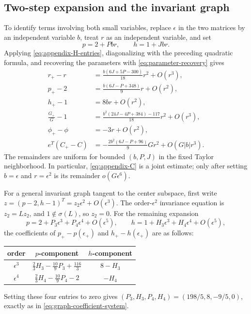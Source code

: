 \documentclass[11pt]{article}
\begin{document}
\subsection{Two-step expansion and the invariant graph}

To identify terms involving both small variables, replace $\epsilon$ in the
two matrices by an independent variable $b$, treat $r$ as an independent
variable, and set
\[
p=2+Pbr,\qquad h=1+Jbr.
\]
Applying \eqref{eq:appendix-H-entries}, diagonalizing with the preceding
quadratic formula, and recovering the parameters with
\eqref{eq:parameter-recovery} gives
\begin{align}
r_+-r
 &=\frac{b(6J+5P-300)}{18}r^2+O(r^3),
\label{eq:appendix-r}\\
p_+-2
 &=\frac{b(6J-P+348)}9r+O(r^2),
\label{eq:appendix-p}\\
h_+-1&=8br+O(r^2),
\label{eq:appendix-h}\\
\frac{G_+}{G}-1
 &=\frac{b^2(24J-4P+384)-117}{18}r^2+O(r^3),
\label{eq:appendix-G}\\
\phi_+-\phi&=-3r+O(r^2),
\label{eq:appendix-phi}\\
e^T(C_+-C)
 &=-\frac{2b^2(6J-P+96)}9Gr^2+O(G|b|r^3).
\label{eq:appendix-C}
\end{align}
The remainders are uniform for bounded $(b,P,J)$ in the fixed Taylor
neighborhood.  In particular, \eqref{eq:appendix-C} is a joint estimate; only
after setting $b=\epsilon$ and $r=\epsilon^2$ is its remainder
$o(G\epsilon^6)$.

For a general invariant graph tangent to the center subspace, first write
$z=(p-2,h-1)^T=z_2\epsilon^2+O(\epsilon^3)$.  The order-$\epsilon^2$
invariance equation is $z_2=Lz_2$, and $1\notin\sigma(L)$, so $z_2=0$.
For the remaining expansion
\[
p=2+P_3\epsilon^3+P_4\epsilon^4+O(\epsilon^5),\qquad
h=1+H_3\epsilon^3+H_4\epsilon^4+O(\epsilon^5),
\]
the coefficients of $p_+-p(\epsilon_+)$ and
$h_+-h(\epsilon_+)$ are as follows:
\begin{center}
\begin{tabular}{c@{\qquad}c@{\qquad}c}
\toprule
order & $p$-component & $h$-component\\
\midrule
$\epsilon^3$ & $\frac23H_3-\frac{10}{9}P_3+\frac{116}{3}$
              & $8-H_3$\\[2pt]
$\epsilon^4$ & $\frac23H_4-\frac{10}{9}P_4-2$
              & $-H_4$\\
\bottomrule
\end{tabular}
\end{center}
Setting these four entries to zero gives
$(P_3,H_3,P_4,H_4)=(198/5,8,-9/5,0)$, exactly as in
\eqref{eq:graph-coefficient-system}.
\end{document}
